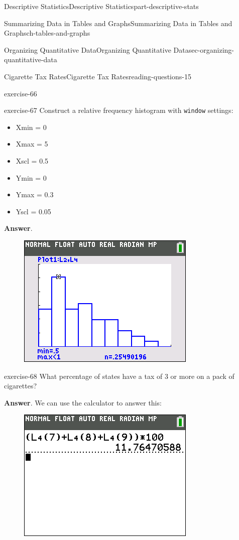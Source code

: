 \documentclass[oneside,10pt,]{book}
\newcommand{\mono}[1]{\texttt{#1}}
\numberwithin{equation}{section}
\begin{document}
\begin{partptx}{Descriptive Statistics}{}{Descriptive Statistics}{}{}{part-descriptive-stats}
\begin{chapterptx}{Summarizing Data in Tables and Graphs}{}{Summarizing Data in Tables and Graphs}{}{}{ch-tables-and-graphs}
\begin{sectionptx}{Organizing Quantitative Data}{}{Organizing Quantitative Data}{}{}{sec-organizing-quantitative-data}
\begin{reading-questions-subsection}{Cigarette Tax Rates}{}{Cigarette Tax Rates}{}{}{reading-questions-15}
\begin{divisionexercise}{3}{}{}{exercise-66}
\begin{sidebyside}{2}{0}{0}{0}
\end{sidebyside}%
\end{divisionexercise}%
\begin{divisionexercise}{4}{}{}{exercise-67}%
\hypertarget{p-75}{}%
Construct a relative frequency histogram with \mono{window} settings:\leavevmode%
\begin{itemize}[label=\textbullet]
\item{}Xmin = 0%
\item{}Xmax = 5%
\item{}Xscl = 0.5%
\item{}Ymin = 0%
\item{}Ymax = 0.3%
\item{}Yscl = 0.05%
\end{itemize}
%
\par\smallskip%
\noindent\textbf{Answer}.\hypertarget{answer-63}{}\quad%
\begin{figure}\centering\includegraphics[width=0.4\linewidth]{images/cigarette-tax-rel-freq-histogram.png}
\end{figure}\end{divisionexercise}%
\begin{divisionexercise}{5}{}{}{exercise-68}%
\hypertarget{p-76}{}%
What percentage of states have a tax of \textdollar{}3 or more on a pack of cigarettes?%
\par\smallskip%
\noindent\textbf{Answer}.\hypertarget{answer-64}{}\quad%
\hypertarget{p-77}{}%
We can use the calculator to answer this:%
\begin{figure}\centering\includegraphics[width=0.4\linewidth]{images/cigarette-tax-rate-percentage.png}
\end{figure}\hypertarget{p-78}{}%

\end{divisionexercise}
\end{reading-questions-subsection}
\end{sectionptx}
\end{chapterptx}
\end{partptx}
\end{document}
